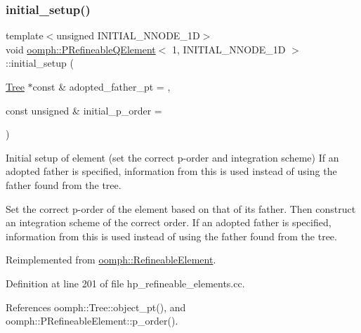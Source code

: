 \subsubsection{\texorpdfstring{initial\+\_\+setup()}{initial\_setup()}}
{\footnotesize\ttfamily template$<$unsigned I\+N\+I\+T\+I\+A\+L\+\_\+\+N\+N\+O\+D\+E\+\_\+1D$>$ \\
void \hyperlink{classoomph_1_1PRefineableQElement}{oomph\+::\+P\+Refineable\+Q\+Element}$<$ 1, I\+N\+I\+T\+I\+A\+L\+\_\+\+N\+N\+O\+D\+E\+\_\+1D $>$\+::initial\+\_\+setup (\begin{DoxyParamCaption}\item[{\hyperlink{classoomph_1_1Tree}{Tree} $\ast$const \&}]{adopted\+\_\+father\+\_\+pt = {},  }\item[{const unsigned \&}]{initial\+\_\+p\+\_\+order = {} }\end{DoxyParamCaption})\hspace{0.3cm}{\ttfamily [virtual]}}



Initial setup of element (set the correct p-\/order and integration scheme) If an adopted father is specified, information from this is used instead of using the father found from the tree. 

Set the correct p-\/order of the element based on that of its father. Then construct an integration scheme of the correct order. If an adopted father is specified, information from this is used instead of using the father found from the tree. 

Reimplemented from \hyperlink{classoomph_1_1RefineableElement_a61ae74d94be7abc7231f34f3322f8e13}{oomph\+::\+Refineable\+Element}.



Definition at line 201 of file hp\+\_\+refineable\+\_\+elements.\+cc.



References oomph\+::\+Tree\+::object\+\_\+pt(), and oomph\+::\+P\+Refineable\+Element\+::p\+\_\+order().

\mbox{\label{classoomph_1_1PRefineableQElement_3_011_00_01INITIAL__NNODE__1D_01_4_af418e512d22efb2f5f70b9b8df74dff4}} 
